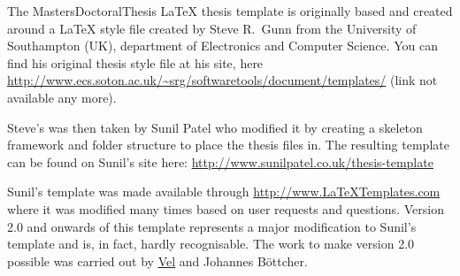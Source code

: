The MastersDoctoralThesis LaTeX thesis template is originally based and created around a LaTeX style file created by Steve R.\ Gunn from the University of Southampton (UK), department of Electronics and Computer Science. You can find his original thesis style file at his site, here
\url{http://www.ecs.soton.ac.uk/~srg/softwaretools/document/templates/} (link not available any more).

Steve's  was then taken by Sunil Patel who modified it by creating a skeleton framework and folder structure to place the thesis files in. The resulting template can be found on Sunil's site here:
\url{http://www.sunilpatel.co.uk/thesis-template}

Sunil's template was made available through \url{http://www.LaTeXTemplates.com} where it was modified many times based on user requests and questions. Version 2.0 and onwards of this template represents a major modification to Sunil's template and is, in fact, hardly recognisable. The work to make version 2.0 possible was carried out by \href{mailto:vel@latextemplates.com}{Vel} and Johannes Böttcher.
